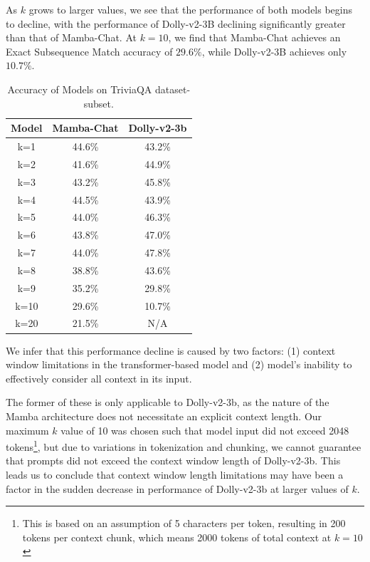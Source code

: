 \documentclass[11pt]{article}
\begin{document}
As $k$ grows to larger values, we see that the performance of both models begins to decline, with the performance of Dolly-v2-3B declining significantly greater than that of Mamba-Chat. At $k=10$, we find that Mamba-Chat achieves an Exact Subsequence Match accuracy of $29.6\%$, while Dolly-v2-3B achieves only $10.7\%$.
\begin{table}[t]
    \centering
    \begin{tabular}{|c|c|c|} 
     \hline
     \textbf{Model} & Mamba-Chat & Dolly-v2-3b \\
     \hline\hline
     k=1 & 44.6\% & 43.2\% \\ 
     \hline
     k=2 & 41.6\% & 44.9\% \\
     \hline
     k=3 & 43.2\% & 45.8\% \\
     \hline
     k=4 & 44.5\% & 43.9\% \\
     \hline
     k=5 & 44.0\% & 46.3\% \\
     \hline
     k=6 & 43.8\% & 47.0\% \\
     \hline
     k=7 & 44.0\% & 47.8\% \\
     \hline
     k=8 & 38.8\% & 43.6\% \\
     \hline
     k=9 & 35.2\% & 29.8\% \\
     \hline
     k=10 & 29.6\% & 10.7\% \\
     \hline
     \hline
     k=20 & 21.5\% & N/A \\
     \hline
    \end{tabular}
    \caption{Accuracy of Models on TriviaQA dataset-subset.}
    \label{tab:my_label}
\end{table}

We infer that this performance decline is caused by two factors: (1) context window limitations in the transformer-based model and (2) model's inability to effectively consider all context in its input. 

The former of these is only applicable to Dolly-v2-3b, as the nature of the Mamba architecture does not necessitate an explicit context length. Our maximum $k$ value of 10 was chosen such that model input did not exceed 2048 tokens\footnote{This is based on an assumption of 5 characters per token, resulting in 200 tokens per context chunk, which means 2000 tokens of total context at $k=10$}, but due to variations in tokenization and chunking, we cannot guarantee that prompts did not exceed the context window length of Dolly-v2-3b. This leads us to conclude that context window length limitations may have been a factor in the sudden decrease in performance of Dolly-v2-3b at larger values of $k$.
\end{document}
